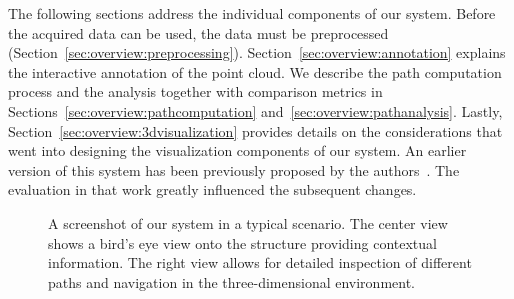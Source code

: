 \documentclass{egpubl}
\begin{document}
The following sections address the individual components of our system. Before the acquired data can be used, the data must be preprocessed (Section~\ref{sec:overview:preprocessing}). Section~\ref{sec:overview:annotation} explains the interactive annotation of the point cloud. We describe the path computation process and the analysis together with comparison metrics in Sections~\ref{sec:overview:pathcomputation} and~\ref{sec:overview:pathanalysis}. Lastly, Section~\ref{sec:overview:3dvisualization} provides details on the considerations that went into designing the visualization components of our system. An earlier version of this system has been previously proposed by the authors~\cite{BKLR14}. The evaluation in that work greatly influenced the subsequent changes.

\begin{figure}
	\newcommand{\abSystemScreenshotWidth}{\columnwidth}
    \centering
    \caption{A screenshot of our system in a typical scenario. The center view shows a bird's eye view onto the structure providing contextual information. The right view allows for detailed inspection of different paths and navigation in the three-dimensional environment.}
    \label{sec:overview:system}
\end{figure}
\end{document}
